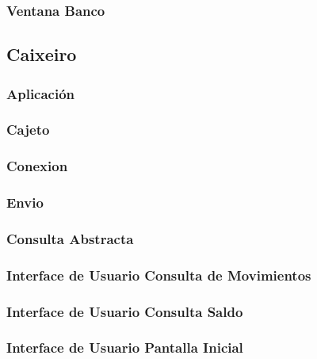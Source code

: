 \documentclass[a4paper,titlepage]{article}
\begin{document}
\subsubsection{Ventana Banco}



\subsection{Caixeiro}
\subsubsection{Aplicación}

\subsubsection{Cajeto}

\subsubsection{Conexion}

\subsubsection{Envio}

\subsubsection{Consulta Abstracta}

\subsubsection{Interface de Usuario Consulta de Movimientos}

\subsubsection{Interface de Usuario Consulta Saldo}

\subsubsection{Interface de Usuario Pantalla Inicial}

\end{document}
